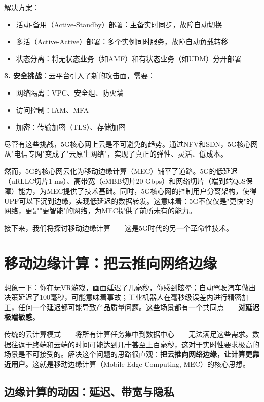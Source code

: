解决方案：
\begin{itemize}
    \item 活动-备用（Active-Standby）部署：主备实时同步，故障自动切换
    \item 多活（Active-Active）部署：多个实例同时服务，故障自动负载转移
    \item 状态分离：将无状态业务（如AMF）和有状态业务（如UDM）分开部署
\end{itemize}

\textbf{3. 安全挑战}：云平台引入了新的攻击面，需要：

\begin{itemize}
    \item 网络隔离：VPC、安全组、防火墙
    \item 访问控制：IAM、MFA
    \item 加密：传输加密（TLS）、存储加密
\end{itemize}

尽管有这些挑战，5G核心网上云是不可避免的趋势。通过NFV和SDN，5G核心网从"电信专网"变成了"云原生网络"，实现了真正的弹性、灵活、低成本。

然而，5G的核心网云化为移动边缘计算（MEC）铺平了道路。5G的低延迟（uRLLC切片1 ms）、高带宽（eMBB切片20 Gbps）和网络切片（端到端QoS保障）能力，为MEC提供了技术基础。同时，5G核心网的控制用户分离架构，使得UPF可以下沉到边缘，实现低延迟的数据转发。这意味着：5G不仅仅是"更快"的网络，更是"更智能"的网络，为MEC提供了前所未有的能力。

接下来，我们将探讨移动边缘计算——这是5G时代的另一个革命性技术。

\section{移动边缘计算：把云推向网络边缘}

想象一下：你在玩VR游戏，画面延迟了几毫秒，你感到眩晕；自动驾驶汽车做出决策延迟了100毫秒，可能意味着事故；工业机器人在毫秒级误差内进行精密加工，任何一个延迟都可能导致产品质量问题。这些场景都有一个共同点——\textbf{对延迟极端敏感}。

传统的云计算模式——将所有计算任务集中到数据中心——无法满足这些需求。数据往返于终端和云端的时间可能达到几十甚至上百毫秒，这对于实时性要求极高的场景是不可接受的。解决这个问题的思路很直观：\textbf{把云推向网络边缘，让计算更靠近用户}。这就是移动边缘计算（Mobile Edge Computing, MEC）的核心思想。

\subsection{边缘计算的动因：延迟、带宽与隐私}

